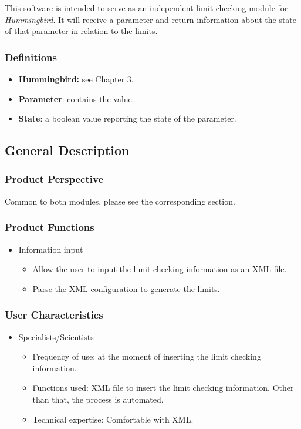 This software is intended to serve as an independent limit checking module for \emph{Hummingbird}. It will receive a parameter and return information about the state of that parameter in relation to the limits.

\subsubsection{Definitions}

\begin{itemize}
\item \textbf{Hummingbird:} see Chapter 3.
\item \textbf{Parameter}: contains the value.
\item \textbf{State}: a boolean value reporting the state of the parameter.
\end{itemize}

\subsection{General Description}
\subsubsection{Product Perspective}

Common to both modules, please see the corresponding section.

\subsubsection{Product Functions}

\begin{itemize}
\item Information input
\begin{itemize}
\item Allow the user to input the limit checking information as an XML file.
\item Parse the XML configuration to generate the limits.
\end{itemize}


\end{itemize}

\subsubsection{User Characteristics}

\begin{itemize}
\item Specialists/Scientists
\begin{itemize}
\item Frequency of use: at the moment of inserting the limit checking information.
\item Functions used: XML file to insert the limit checking information. Other than that, the process is automated.
\item Technical expertise: Comfortable with XML.
\end{itemize}
\end{itemize}


